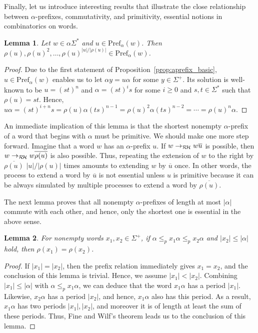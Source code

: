 \documentclass{article}
\theoremstyle{plain}
\newtheorem{lemma}{Lemma}
\theoremstyle{remark}
\newcommand{\RHC}{\ensuremath{\mathcal{R\hspace*{-0.5mm}H}}}
\newcommand{\Pref}{\ensuremath{\mathrm{Pref}}}
\begin{document}
Finally, let us introduce interesting results that illustrate the close relationship between $\alpha$-prefixes, commutativity, and primitivity, essential notions in combinatorics on words. 

\begin{lemma}\label{lem:primitive_apref}
	Let $w \in \alpha \Sigma^*$ and $u \in \Pref_\alpha(w)$. 
	Then $\rho(u), \rho(u)^2, \ldots, \rho(u)^{|u|/|\rho(u)|} \in \Pref_\alpha(w)$. 
\end{lemma}
\begin{proof}
	Due to the first statement of Proposition~\ref{prop:aprefix_basic}, $u \in \Pref_\alpha(w)$ enables us to let $\alpha y = u \alpha$ for some $y \in \Sigma^+$. 
	Its solution is well-known to be $u = (st)^n$ and $\alpha = (st)^i s$ for some $i \ge 0$ and $s, t \in \Sigma^*$ such that $\rho(u) = st$. 
	Hence, $u \alpha = (st)^{i+n}s = \rho(u) \alpha (ts)^{n-1} = \rho(u)^2 \alpha (ts)^{n-2} = \cdots = \rho(u)^n \alpha$. 
\end{proof}

An immediate implication of this lemma is that the shortest nonempty $\alpha$-prefix of a word that begins with $\alpha$ must be primitive. 
We should make one more step forward. 
Imagine that a word $w$ has an $\alpha$-prefix $u$. 
If $w \to_{\RHC} w \overline{u}$ is possible, then $w \to_{\RHC} w\overline{\rho(u)}$ is also possible. 
Thus, repeating the extension of $w$ to the right by $\overline{\rho(u)}$ $|u|/|\rho(u)|$ times amounts to extending $w$ by $\overline{u}$ once. 
In other words, the process to extend a word by $\overline{u}$ is not essential unless $u$ is primitive because it can be always simulated by multiple processes to extend a word by $\overline{\rho(u)}$. 

The next lemma proves that all nonempty $\alpha$-prefixes of length at most $|\alpha|$ commute with each other, and hence, only the shortest one is essential in the above sense. 

\begin{lemma}
	For nonempty words $x_1, x_2 \in \Sigma^+$, if $\alpha \le_p x_1 \alpha \le_p x_2 \alpha$ and $|x_2| \le |\alpha|$ hold, then $\rho(x_1) = \rho(x_2)$. 
\end{lemma}
\begin{proof}
	If $|x_1| = |x_2|$, then the prefix relation immediately gives $x_1 = x_2$, and the conclusion of this lemma is trivial. 
	Hence, we assume $|x_1| < |x_2|$. 
	Combining $|x_1| \le |\alpha|$ with $\alpha \le_p x_1 \alpha$, we can deduce that the word $x_1 \alpha$ has a period $|x_1|$. 
	Likewise, $x_2\alpha$ has a period $|x_2|$, and hence, $x_1 \alpha$ also has this period. 
	As a result, $x_1\alpha$ has two periods $|x_1|, |x_2|$, and moreover it is of length at least the sum of these periods. 
	Thus, Fine and Wilf's theorem \cite{ChKa97, FiWi65} leads us to the conclusion of this lemma. 
\end{proof}
\end{document}
